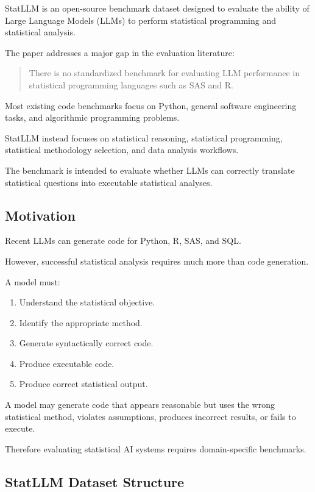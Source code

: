 \documentclass[11pt]{article}
\begin{document}
StatLLM is an open-source benchmark dataset designed to evaluate the ability of Large Language Models (LLMs) to perform statistical programming and statistical analysis.

The paper addresses a major gap in the evaluation literature:

\begin{quote}
There is no standardized benchmark for evaluating LLM performance in statistical programming languages such as SAS and R.
\end{quote}

Most existing code benchmarks focus on Python, general software engineering tasks, and algorithmic programming problems.

StatLLM instead focuses on statistical reasoning, statistical programming, statistical methodology selection, and data analysis workflows.

The benchmark is intended to evaluate whether LLMs can correctly translate statistical questions into executable statistical analyses.

\subsection*{Motivation}

Recent LLMs can generate code for Python, R, SAS, and SQL.

However, successful statistical analysis requires much more than code generation.

A model must:

\begin{enumerate}
    \item Understand the statistical objective.
    \item Identify the appropriate method.
    \item Generate syntactically correct code.
    \item Produce executable code.
    \item Produce correct statistical output.
\end{enumerate}

A model may generate code that appears reasonable but uses the wrong statistical method, violates assumptions, produces incorrect results, or fails to execute.

Therefore evaluating statistical AI systems requires domain-specific benchmarks.

\subsection*{StatLLM Dataset Structure}
\end{document}
